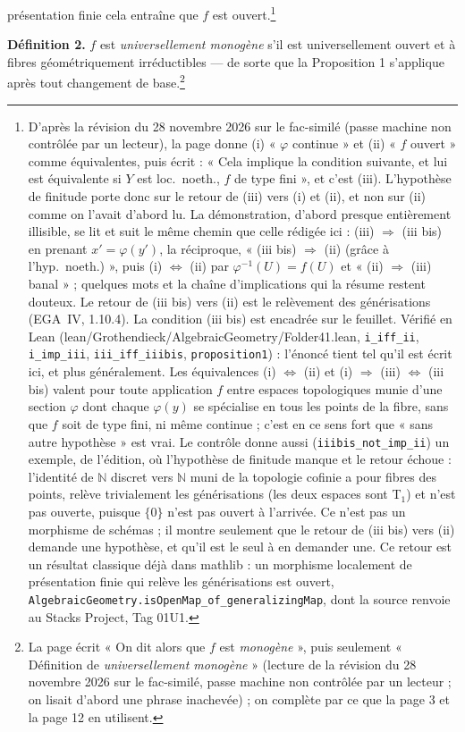 \documentclass[11pt,a4paper]{article}
\begin{document}
présentation finie cela entraîne que $f$ est ouvert.\footnote{D'après la
révision du 28 novembre 2026 sur le fac-similé (passe machine non contrôlée
par un lecteur), la page donne (i) « $\varphi$ continue » et (ii) « $f$
ouvert » comme équivalentes, puis écrit : « Cela implique la condition
suivante, et lui est équivalente si $Y$ est loc.\ noeth., $f$ de type fini »,
et c'est (iii). L'hypothèse de finitude porte donc sur le retour de (iii) vers
(i) et (ii), et non sur (ii) comme on l'avait d'abord lu. La démonstration,
d'abord presque entièrement illisible, se lit et suit le même chemin que
celle rédigée ici : (iii) $\Rightarrow$ (iii bis) en prenant
$x' = \varphi(y')$, la réciproque, « (iii bis) $\Rightarrow$ (ii) (grâce à
l'hyp.\ noeth.) », puis (i) $\Leftrightarrow$ (ii) par
$\varphi^{-1}(U) = f(U)$ et « (ii) $\Rightarrow$ (iii) banal » ; quelques
mots et la chaîne d'implications qui la résume restent douteux. Le retour de
(iii bis) vers (ii) est le relèvement des générisations
(EGA~IV, 1.10.4). La condition (iii bis) est encadrée sur le feuillet.
Vérifié en Lean (lean/Grothendieck/AlgebraicGeometry/Folder41.lean, \texttt{i\_iff\_ii},
\texttt{i\_imp\_iii}, \texttt{iii\_iff\_iiibis}, \texttt{proposition1}) :
l'énoncé tient tel qu'il est écrit ici, et plus généralement. Les
équivalences (i) $\Leftrightarrow$ (ii) et (i) $\Rightarrow$ (iii)
$\Leftrightarrow$ (iii bis) valent pour toute application $f$ entre espaces
topologiques munie d'une section $\varphi$ dont chaque $\varphi(y)$ se
spécialise en tous les points de la fibre, sans que $f$ soit de type fini, ni
même continue ; c'est en ce sens fort que « sans autre hypothèse » est vrai. Le
contrôle donne aussi (\texttt{iiibis\_not\_imp\_ii}) un exemple, de
l'édition, où l'hypothèse de finitude manque et le retour échoue : l'identité
de $\mathbb{N}$ discret vers $\mathbb{N}$ muni de la topologie cofinie a pour
fibres des points, relève trivialement les générisations (les deux espaces
sont T$_1$) et n'est pas ouverte, puisque $\{0\}$ n'est pas ouvert à
l'arrivée. Ce n'est pas un morphisme de schémas ; il montre seulement que le
retour de (iii bis) vers (ii) demande une hypothèse, et qu'il est le seul à en
demander une. Ce retour est un résultat classique déjà dans mathlib : un
morphisme localement de présentation finie qui relève les générisations est
ouvert, \texttt{AlgebraicGeometry.isOpenMap\_of\_generalizingMap},
dont la source renvoie au Stacks Project, Tag 01U1.}

\textbf{Définition 2.} $f$ est \emph{universellement monogène} s'il est
universellement ouvert et à fibres géométriquement irréductibles --- de sorte
que la Proposition 1 s'applique après tout changement de
base.\footnote{La page écrit « On dit alors que $f$ est \emph{monogène} », puis
seulement « Définition de \emph{universellement monogène} » (lecture de la
révision du 28 novembre 2026 sur le fac-similé, passe machine non contrôlée
par un lecteur ; on lisait d'abord une phrase inachevée) ; on complète par ce
que la page 3 et la page 12 en utilisent.}
\end{document}
